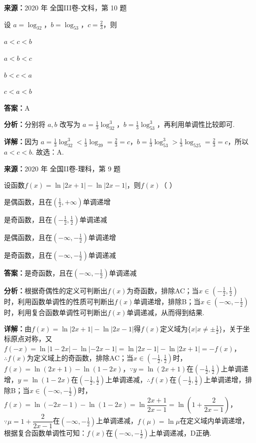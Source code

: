 \begin{question}[points=5]
\textbf{来源：}2020 年 全国III卷-文科，第 10 题\par
设 $a=\log_32$，$b=\log_53$，$c=\frac{2}{3}$，则
\begin{choices}
  \item $a<c<b$
  \item $a<b<c$
  \item $b<c<a$
  \item $c<a<b$
\end{choices}
\begin{solution}
\textbf{答案：}A

\textbf{分析：}分别将 $a,b$ 改写为 $a=\frac{1}{3}\log_32^3$，$b=\frac{1}{3}\log_53^3$，再利用单调性比较即可.

\textbf{详解：}因为 $a=\frac{1}{3}\log_32^3<\frac{1}{3}\log_39=\frac{2}{3}=c$，$b=\frac{1}{3}\log_53^3>\frac{1}{3}\log_525=\frac{2}{3}=c$，所以 $a<c<b$. 故选：A.
\end{solution}
\end{question}

\begin{question}[points=5]
\textbf{来源：}2020 年 全国II卷-理科，第 9 题\par
设函数$f(x)=\ln|2x+1|-\ln|2x-1|$，则$f(x)$（ ）
\begin{choices}
  \item 是偶函数，且在$(\frac12,+\infty)$单调递增
  \item 是奇函数，且在$(-\frac12,\frac12)$单调递减
  \item 是偶函数，且在$(-\infty,-\frac12)$单调递增
  \item 是奇函数，且在$(-\infty,-\frac12)$单调递减
\end{choices}
\begin{solution}
\textbf{答案：}是奇函数，且在$(-\infty,-\frac12)$单调递减

\textbf{分析：}根据奇偶性的定义可判断出$f(x)$为奇函数，排除AC；当$x\in(-\frac12,\frac12)$时，利用函数单调性的性质可判断出$f(x)$单调递增，排除B；当$x\in(-\infty,-\frac12)$时，利用复合函数单调性可判断出$f(x)$单调递减，从而得到结果.

\textbf{详解：}由$f(x)=\ln|2x+1|-\ln|2x-1|$得$f(x)$定义域为$\{x|x\neq\pm\frac12\}$，关于坐标原点对称，又$f(-x)=\ln|1-2x|-\ln|-2x-1|=\ln|2x-1|-\ln|2x+1|=-f(x)$，$\therefore f(x)$为定义域上的奇函数，排除AC；当$x\in(-\frac12,\frac12)$时，$f(x)=\ln(2x+1)-\ln(1-2x)$，$\because y=\ln(2x+1)$在$(-\frac12,\frac12)$上单调递增，$y=\ln(1-2x)$在$(-\frac12,\frac12)$上单调递减，$\therefore f(x)$在$(-\frac12,\frac12)$上单调递增，排除B；当$x\in(-\infty,-\frac12)$时，$f(x)=\ln(-2x-1)-\ln(1-2x)=\ln\dfrac{2x+1}{2x-1}=\ln\left(1+\dfrac{2}{2x-1}\right)$，$\because \mu=1+\dfrac{2}{2x-1}$在$(-\infty,-\frac12)$上单调递减，$f(\mu)=\ln\mu$在定义域内单调递增，根据复合函数单调性可知：$f(x)$在$(-\infty,-\frac12)$上单调递减，D正确.
\end{solution}
\end{question}

